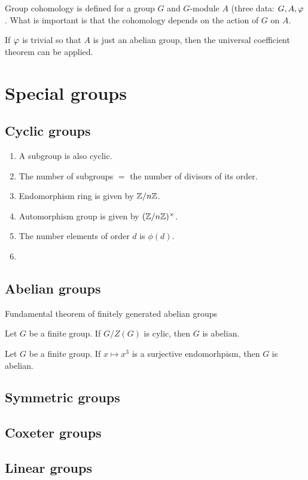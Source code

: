 \documentclass{../note}
\begin{document}
Group cohomology is defined for a group $G$ and $G$-module $A$ (three data: $G,A,\varphi$.
What is important is that the cohomology depends on the action of $G$ on $A$.

If $\varphi$ is trivial so that $A$ is just an abelian group, then the universal coefficient theorem can be applied.




\section{Special groups}

\subsection{Cyclic groups}
\begin{enumerate}
\item A subgroup is also cyclic.
\item The number of subgroups $=$ the number of divisors of its order.
\item Endomorphism ring is given by $\mathbb{Z}/n\mathbb{Z}$.
\item Automorphism group is given by $(\mathbb{Z}/n\mathbb{Z})^\times$.
\item The number elements of order $d$ is $\phi(d)$.
\item
\end{enumerate}

\subsection{Abelian groups}
Fundamental theorem of finitely generated abelian groups

\begin{thm}
Let $G$ be a finite group.
If $G/Z(G)$ is cylic, then $G$ is abelian.
\end{thm}
\begin{thm}
Let $G$ be a finite group.
If $x\mapsto x^3$ is a surjective endomorhpism, then $G$ is abelian.
\end{thm}

\subsection{Symmetric groups}
\subsection{Coxeter groups}
\subsection{Linear groups}
\end{document}

